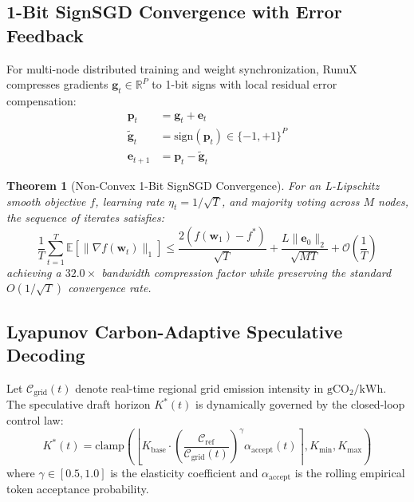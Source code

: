 \documentclass[10pt,twocolumn]{article}
\newtheorem{theorem}{Theorem}
\begin{document}
\subsection{1-Bit SignSGD Convergence with Error Feedback}

For multi-node distributed training and weight synchronization, RunuX compresses gradients $\mathbf{g}_t \in \mathbb{R}^P$ to 1-bit signs with local residual error compensation:
\begin{align}
    \mathbf{p}_t &= \mathbf{g}_t + \mathbf{e}_t \\
    \tilde{\mathbf{g}}_t &= \mathrm{sign}(\mathbf{p}_t) \in \{-1, +1\}^P \\
    \mathbf{e}_{t+1} &= \mathbf{p}_t - \tilde{\mathbf{g}}_t
\end{align}

\begin{theorem}[Non-Convex 1-Bit SignSGD Convergence]
For an L-Lipschitz smooth objective $f$, learning rate $\eta_t = 1/\sqrt{T}$, and majority voting across $M$ nodes, the sequence of iterates satisfies:
\begin{equation}
    \frac{1}{T} \sum_{t=1}^T \mathbb{E}[\|\nabla f(\mathbf{w}_t)\|_1] \le \frac{2(f(\mathbf{w}_1) - f^*)}{\sqrt{T}} + \frac{L \|\mathbf{e}_0\|_2}{\sqrt{M T}} + \mathcal{O}\left(\frac{1}{T}\right)
\end{equation}
achieving a $32.0\times$ bandwidth compression factor while preserving the standard $O(1/\sqrt{T})$ convergence rate.
\end{theorem}

\subsection{Lyapunov Carbon-Adaptive Speculative Decoding}

Let $\mathcal{C}_{\mathrm{grid}}(t)$ denote real-time regional grid emission intensity in $\mathrm{gCO_2/kWh}$. The speculative draft horizon $K^*(t)$ is dynamically governed by the closed-loop control law:
\begin{equation}
    K^*(t) = \mathrm{clamp}\left( \left\lfloor K_{\mathrm{base}} \cdot \left(\frac{\mathcal{C}_{\mathrm{ref}}}{\mathcal{C}_{\mathrm{grid}}(t)}\right)^\gamma \alpha_{\mathrm{accept}}(t) \right\rceil, K_{\min}, K_{\max} \right)
\end{equation}
where $\gamma \in [0.5, 1.0]$ is the elasticity coefficient and $\alpha_{\mathrm{accept}}$ is the rolling empirical token acceptance probability.
\end{document}
